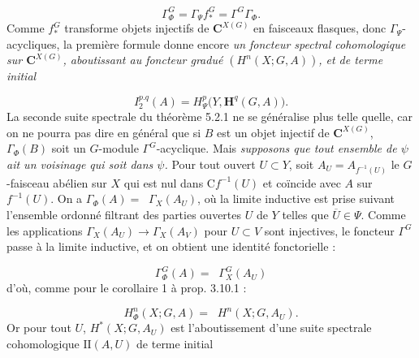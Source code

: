\clearpage
{}

\begin{equation}
\Gamma_\Phi^G=\Gamma_\Psi f_*^G=\Gamma^G\Gamma_\Phi.
\tag{5.7.3}
\end{equation}
Comme $f_*^G$ transforme objets injectifs de ${\mathbf C}^{X(G)}$ en faisceaux
flasques, donc $\Gamma_\Psi$-acycliques, la première formule donne encore
\textit{un foncteur spectral cohomologique sur ${\mathbf C}^{X(G)}$, aboutissant au
foncteur gradué $(H^n(X;G,A))$, et de terme initial}

\begin{equation}
I_2^{p.q}(A)=H_\Psi^p\bigl(Y,\mathbf H^q(G,A)\bigr).
\tag{5.7.4}
\end{equation}
La seconde suite spectrale du théorème 5.2.1 ne se généralise plus telle
quelle, car on ne pourra pas dire en général que si $B$ est un objet injectif
de ${\mathbf C}^{X(G)}$, $\Gamma_\Phi(B)$ soit un $G$-module $\Gamma^G$-acyclique. Mais
\textit{supposons que tout ensemble de $\psi$ ait un voisinage qui soit dans
$\psi$.}
Pour tout ouvert $U\subset Y$, soit $A_U=A_{f^{-1}(U)}$ le $G$-faisceau
abélien sur $X$ qui est nul dans $\mathrm C f^{-1}(U)$ et coïncide avec $A$ sur
$f^{-1}(U)$. On a
$\Gamma_\Phi(A)=\mathop{\underset{\to}{\lim}}\Gamma_X(A_U)$, où la limite inductive est prise
suivant l'ensemble ordonné filtrant des parties ouvertes $U$ de $Y$ telles
que $\overline U\in\Psi$. Comme les applications
$\Gamma_X(A_U)\to\Gamma_X(A_V)$ pour $U\subset V$ sont injectives, le foncteur
$\Gamma^G$ passe à la limite inductive, et on obtient une identité
fonctorielle :

\begin{equation}
\Gamma_\Phi^G(A)=\mathop{\underset{\to}{\lim.}}\Gamma_X^G(A_U)
\tag{5.7.5}
\end{equation}
d'où, comme pour le corollaire 1 à prop. 3.10.1 :

\begin{equation}
H_\Phi^n(X;G,A)=\mathop{\underset{\to}{\lim}} H^n(X;G,A_U).
\tag{5.7.6}
\end{equation}
Or pour tout $U$, $H^*(X;G,A_U)$ est l'aboutissement d'une suite spectrale
cohomologique $\mathrm {II}(A,U)$ de terme initial

